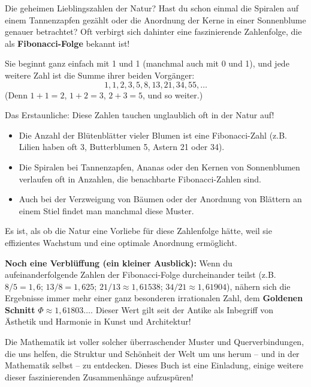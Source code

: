 \begin{funfactbox}{Die geheimen Lieblingszahlen der Natur?}
Hast du schon einmal die Spiralen auf einem Tannenzapfen gezählt oder die Anordnung der Kerne in einer Sonnenblume genauer betrachtet? Oft verbirgt sich dahinter eine faszinierende Zahlenfolge, die als \textbf{Fibonacci-Folge} bekannt ist!

Sie beginnt ganz einfach mit 1 und 1 (manchmal auch mit 0 und 1), und jede weitere Zahl ist die Summe ihrer beiden Vorgänger:
\[ 1, 1, 2, 3, 5, 8, 13, 21, 34, 55, \dots \]
(Denn $1+1=2$, $1+2=3$, $2+3=5$, und so weiter.)

Das Erstaunliche: Diese Zahlen tauchen unglaublich oft in der Natur auf!
\begin{itemize}
    \item Die Anzahl der Blütenblätter vieler Blumen ist eine Fibonacci-Zahl (z.B. Lilien haben oft 3, Butterblumen 5, Astern 21 oder 34).
    \item Die Spiralen bei Tannenzapfen, Ananas oder den Kernen von Sonnenblumen verlaufen oft in Anzahlen, die benachbarte Fibonacci-Zahlen sind.
    \item Auch bei der Verzweigung von Bäumen oder der Anordnung von Blättern an einem Stiel findet man manchmal diese Muster.
\end{itemize}
Es ist, als ob die Natur eine Vorliebe für diese Zahlenfolge hätte, weil sie effizientes Wachstum und eine optimale Anordnung ermöglicht.

\textbf{Noch eine Verblüffung (ein kleiner Ausblick):} Wenn du aufeinanderfolgende Zahlen der Fibonacci-Folge durcheinander teilst (z.B. $8/5 = 1,6$; $13/8 = 1,625$; $21/13 \approx 1,61538$; $34/21 \approx 1,61904$), nähern sich die Ergebnisse immer mehr einer ganz besonderen irrationalen Zahl, dem \textbf{Goldenen Schnitt} $\Phi \approx 1,61803\dots$. Dieser Wert gilt seit der Antike als Inbegriff von Ästhetik und Harmonie in Kunst und Architektur!

Die Mathematik ist voller solcher überraschender Muster und Querverbindungen, die uns helfen, die Struktur und Schönheit der Welt um uns herum – und in der Mathematik selbst – zu entdecken. Dieses Buch ist eine Einladung, einige weitere dieser faszinierenden Zusammenhänge aufzuspüren!


\end{funfactbox}
